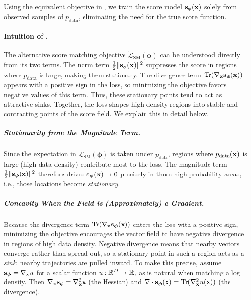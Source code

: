 Using the equivalent objective in , we train the score model ${\mathbf{s}}_{\bm{\phi}}({\mathbf{x}})$ solely from observed samples of $p_{\mathrm{data}}$, eliminating the need for the true score function.


\paragraph{Intuition of .}
The alternative score matching objective $\widetilde{\mathcal{L}}_{\text{SM}}(\bm\phi)$
can be understood directly from its two terms.
The norm term $\tfrac12\|{\mathbf{s}}_{\bm\phi}({\mathbf{x}})\|^2$ suppresses the score in regions where
$p_{\mathrm{data}}$ is large, making them stationary.
The divergence term $\operatorname{Tr}(\nabla_{{\mathbf{x}}} {\mathbf{s}}_{\bm\phi}({\mathbf{x}}))$ appears with a positive sign in the loss, so minimizing the objective favors negative values of this term.
Thus, these stationary points tend to act as attractive sinks.
Together, the loss shapes high-density regions into stable and contracting points of the score field.
We explain this in detail below.

\subparagraph{Stationarity from the Magnitude Term.}
Since the expectation in $\widetilde{\mathcal{L}}_{\mathrm{SM}}(\bm\phi)$ is taken under
$p_{\mathrm{data}}$, regions where $p_{\mathrm{data}}({\mathbf{x}})$ is large (high data density)
contribute most to the loss. The magnitude term
$\tfrac12\|{\mathbf{s}}_{\bm\phi}({\mathbf{x}})\|^2$ therefore drives
${\mathbf{s}}_{\bm\phi}({\mathbf{x}})\to 0$ precisely in those high-probability areas, i.e., those locations become \emph{stationary}.

\subparagraph{Concavity When the Field is (Approximately) a Gradient.}
Because the divergence term $\operatorname{Tr}(\nabla_{{\mathbf{x}}} {\mathbf{s}}_{\bm\phi}({\mathbf{x}}))$ enters the loss with a positive sign, minimizing the objective encourages the vector field to have
negative divergence in regions of high data density. Negative divergence means that nearby vectors
converge rather than spread out, so a stationary point in such a region acts as a \emph{sink}:
nearby trajectories are pulled inward. To make this precise, assume
${\mathbf{s}}_{\bm\phi}=\nabla_{{\mathbf{x}}}u$ for a scalar function $u:\mathbb{R}^D\to\mathbb{R}$, as is natural when matching a
log density. Then $\nabla_{{\mathbf{x}}}{\mathbf{s}}_{\bm\phi}=\nabla_{{\mathbf{x}}}^2 u$ (the Hessian) and
$\nabla \cdot {\mathbf{s}}_{\bm\phi}({\mathbf{x}})=\operatorname{Tr}(\nabla_{{\mathbf{x}}}^2 u({\mathbf{x}}))$ (the divergence).

